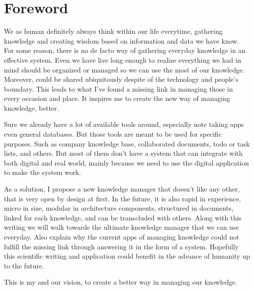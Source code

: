 \begingroup
\let\clearpage\relax
\let\cleardoublepage\relax

\chapter{Foreword}
\label{chap:foreword}

We as human definitely always think within our life everytime, gathering knowledge and creating wisdom based on information and data we have know. For some reason, there is no de facto way of gathering everyday knowledge in an effective system. Even we have live long enough to realize everything we had in mind should be organized or managed so we can use the most of our knowledge. Moreover, could be shared ubiquitously despite of the technology and people's boundary. This leads to what I've found a missing link in managing those in every occasion and place. It inspires me to create the new way of managing knowledge, better.

Sure we already have a lot of available tools around, especially note taking apps even general databases. But those tools are meant to be used for specific purposes. Such as company knowledge base, collaborated documents, todo or task lists, and others. But most of them don't have a system that can integrate with both digital and real world, mainly because we need to use the digital application to make the system work.

As a solution, I propose a new knowledge manager that doesn't like any other, that is very open by design at first. In the future, it is also rapid in experience, micro in size, modular in architecture components, structured in documents, linked for each knowledge, and can be transcluded with others. Along with this writing we will walk towards the ultimate knowledge manager that we can use everyday. Also explain why the current apps of managing knowledge could not fulfill the missing link through answering it in the form of a system. Hopefully this scientific writing and application could benefit in the advance of humanity up to the future.

This is my and our vision, to create a better way in managing our knowledge.

\endgroup
